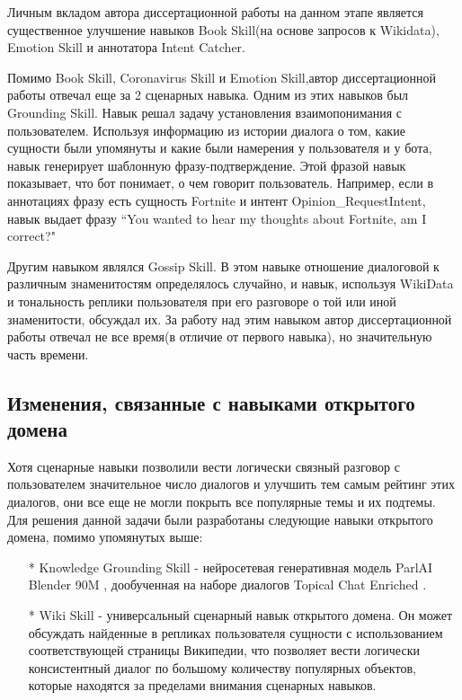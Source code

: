 Личным вкладом автора диссертационной работы на данном этапе является существенное улучшение навыков Book Skill(на основе запросов к Wikidata), Emotion Skill и аннотатора Intent Catcher. 

Помимо Book Skill, Coronavirus Skill и Emotion Skill,автор диссертационной работы отвечал еще за 2 сценарных навыка.
Одним из этих навыков был Grounding Skill. Навык решал задачу установления взаимопонимания с пользователем. Используя информацию из истории диалога о том, какие сущности были упомянуты и какие были намерения у пользователя и у бота, навык генерирует шаблонную фразу-подтверждение. Этой фразой навык показывает, что бот понимает, о чем говорит пользователь. Например, если в аннотациях фразу есть сущность Fortnite и интент Opinion\_RequestIntent, навык выдает фразу “You wanted to hear my thoughts about Fortnite, am I correct?"

Другим навыком являлся Gossip Skill. В этом навыке отношение диалоговой к различным знаменитостям определялось случайно, и навык, используя WikiData и тональность реплики пользователя при его разговоре о той или иной знаменитости, обсуждал их. За работу над этим навыком автор диссертационной работы отвечал не все время(в отличие от первого навыка), но значительную часть времени.

\subsection{Изменения, связанные с навыками открытого домена}

Хотя сценарные навыки позволили вести логически связный разговор с пользователем значительное число диалогов и улучшить тем самым рейтинг этих диалогов, они все еще не могли покрыть все популярные темы и их подтемы. Для решения данной задачи были разработаны следующие навыки открытого домена, помимо упомянутых выше:
\begin{itemize}
\item[*] Knowledge Grounding Skill - нейросетевая генеративная модель ParlAI Blender 90M \cite{roller_other_2020}, дообученная на наборе диалогов Topical Chat Enriched \cite{hedayatnia_2020}.
\item[*] Wiki Skill - универсальный сценарный навык открытого домена. Он может обсуждать найденные в репликах пользователя сущности с использованием соответствующей страницы Википедии, что позволяет вести логически консистентный диалог по большому количеству популярных объектов, которые находятся за пределами внимания сценарных навыков.
\end{itemize}
